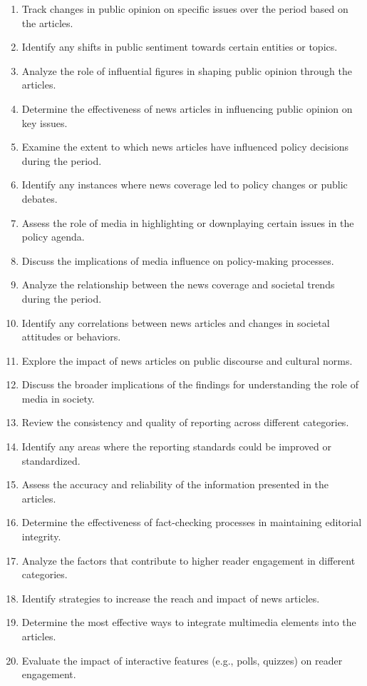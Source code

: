 \begin{footnotesize}
\begin{enumerate}[label={\(q_{\arabic*}\).},start=60]
\item Track changes in public opinion on specific issues over the period based on the articles.
\item Identify any shifts in public sentiment towards certain entities or topics.
\item Analyze the role of influential figures in shaping public opinion through the articles.
\item Determine the effectiveness of news articles in influencing public opinion on key issues.
\item Examine the extent to which news articles have influenced policy decisions during the period.
\item Identify any instances where news coverage led to policy changes or public debates.
\item Assess the role of media in highlighting or downplaying certain issues in the policy agenda.
\item Discuss the implications of media influence on policy-making processes.
\item Analyze the relationship between the news coverage and societal trends during the period.
\item Identify any correlations between news articles and changes in societal attitudes or behaviors.
\item Explore the impact of news articles on public discourse and cultural norms.
\item Discuss the broader implications of the findings for understanding the role of media in society.
\item Review the consistency and quality of reporting across different categories.
\item Identify any areas where the reporting standards could be improved or standardized.
\item Assess the accuracy and reliability of the information presented in the articles.
\item Determine the effectiveness of fact-checking processes in maintaining editorial integrity.
\item Analyze the factors that contribute to higher reader engagement in different categories.
\item Identify strategies to increase the reach and impact of news articles.
\item Determine the most effective ways to integrate multimedia elements into the articles.
\item Evaluate the impact of interactive features (e.g., polls, quizzes) on reader engagement.

\end{enumerate}
\end{footnotesize}
